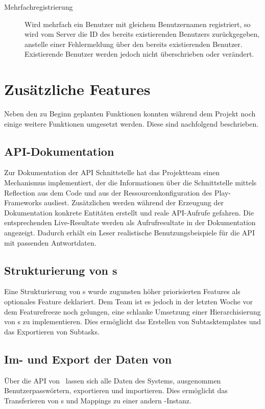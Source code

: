 		\begin{description}
			\item[Mehrfachregistrierung] Wird mehrfach ein Benutzer mit gleichem Benutzernamen registriert, so wird vom Server die ID des bereits existierenden Benutzers zurückgegeben, anstelle einer Fehlermeldung über den bereits existierenden Benutzer.
			Existierende Benutzer werden jedoch nicht überschrieben oder verändert.
		\end{description}
	
	
	\section{Zusätzliche Features}
		Neben den zu Beginn geplanten Funktionen konnten während dem Projekt noch einige weitere Funktionen umgesetzt werden.
		Diese sind nachfolgend beschrieben.
		\subsection{API-Dokumentation}
			Zur Dokumentation der API Schnittstelle hat das Projektteam
			einen Mechanismus implementiert, der die Informationen über die Schnittstelle mittels Reflection aus dem Code und aus der Ressourcenkonfiguration des Play-Frameworks ausliest.
			Zusätzlichen werden während der Erzeugung der Dokumentation konkrete Entitäten erstellt und reale API-Aufrufe gefahren.
			Die entsprechenden Live-Resultate werden als Aufrufresultate in der Dokumentation angezeigt.
			Dadurch erhält ein Leser realistische Benutzungsbeispiele für die API mit passenden Antwortdaten.
			
	
		\subsection{Strukturierung von \ttpl s}
			Eine Strukturierung von \ttpl s wurde zugunsten höher priorisierten Features als optionales Feature deklariert.
			Dem Team ist es jedoch in der letzten Woche vor dem Featurefreeze noch gelungen, eine schlanke Umsetzung einer Hierarchisierung von \ttpl s zu implementieren.
			Dies ermöglicht das Erstellen von Subtasktemplates und das Exportieren von Subtasks.
			
		
		\subsection{Im- und Export der Daten von \eeppi}
			Über die API von \eeppi\ lassen sich alle Daten des Systems,
			ausgenommen Benutzerpasswörtern, exportieren und importieren.
			Dies ermöglicht das Transferieren von \ttpl s und Mappings zu einer andern \eeppi -Instanz.
			
